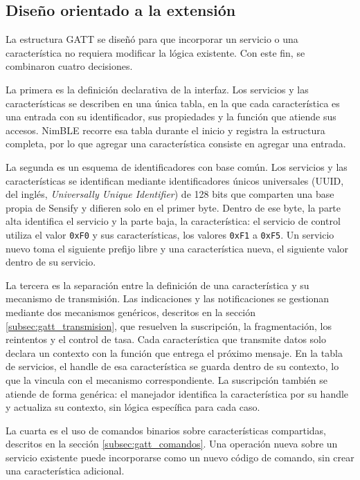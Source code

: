 \subsection{Diseño orientado a la extensión}
\label{subsec:gatt_extension}

La estructura GATT se diseñó para que incorporar un servicio o una característica no requiera modificar la lógica existente. Con este fin, se combinaron cuatro decisiones.

La primera es la definición declarativa de la interfaz. Los servicios y las características se describen en una única tabla, en la que cada característica es una entrada con su identificador, sus propiedades y la función que atiende sus accesos. NimBLE recorre esa tabla durante el inicio y registra la estructura completa, por lo que agregar una característica consiste en agregar una entrada.

La segunda es un esquema de identificadores con base común. Los servicios y las características se identifican mediante identificadores únicos universales (UUID, del inglés, \textit{Universally Unique Identifier}) de 128 bits que comparten una base propia de Sensify y difieren solo en el primer byte. Dentro de ese byte, la parte alta identifica el servicio y la parte baja, la característica: el servicio de control utiliza el valor \texttt{0xF0} y sus características, los valores \texttt{0xF1} a \texttt{0xF5}. Un servicio nuevo toma el siguiente prefijo libre y una característica nueva, el siguiente valor dentro de su servicio.

La tercera es la separación entre la definición de una característica y su mecanismo de transmisión. Las indicaciones y las notificaciones se gestionan mediante dos mecanismos genéricos, descritos en la sección \ref{subsec:gatt_transmision}, que resuelven la suscripción, la fragmentación, los reintentos y el control de tasa. Cada característica que transmite datos solo declara un contexto con la función que entrega el próximo mensaje. En la tabla de servicios, el handle de esa característica se guarda dentro de su contexto, lo que la vincula con el mecanismo correspondiente. La suscripción también se atiende de forma genérica: el manejador identifica la característica por su handle y actualiza su contexto, sin lógica específica para cada caso.

La cuarta es el uso de comandos binarios sobre características compartidas, descritos en la sección \ref{subsec:gatt_comandos}. Una operación nueva sobre un servicio existente puede incorporarse como un nuevo código de comando, sin crear una característica adicional.

